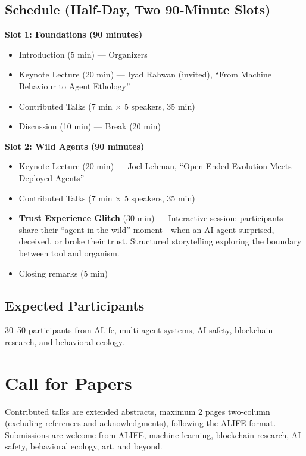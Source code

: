 \documentclass[letterpaper]{article}
\begin{document}
\subsection*{Schedule (Half-Day, Two 90-Minute Slots)}

\textbf{Slot 1: Foundations (90 minutes)}
\begin{itemize}[nosep]
\item Introduction (5 min) --- Organizers
\item Keynote Lecture (20 min) --- Iyad Rahwan (invited), ``From Machine Behaviour to Agent Ethology''
\item Contributed Talks (7 min $\times$ 5 speakers, 35 min)
\item Discussion (10 min) --- Break (20 min)
\end{itemize}

\textbf{Slot 2: Wild Agents (90 minutes)}
\begin{itemize}[nosep]
\item Keynote Lecture (20 min) --- Joel Lehman, ``Open-Ended Evolution Meets Deployed Agents''
\item Contributed Talks (7 min $\times$ 5 speakers, 35 min)
\item \textbf{Trust Experience Glitch} (30 min) --- Interactive session: participants share their ``agent in the wild'' moment---when an AI agent surprised, deceived, or broke their trust. Structured storytelling exploring the boundary between tool and organism.
\item Closing remarks (5 min)
\end{itemize}

\subsection*{Expected Participants}
30--50 participants from ALife, multi-agent systems, AI safety, blockchain research, and behavioral ecology.

\section{Call for Papers}

Contributed talks are extended abstracts, maximum 2 pages two-column (excluding references and acknowledgments), following the ALIFE format. Submissions are welcome from ALIFE, machine learning, blockchain research, AI safety, behavioral ecology, art, and beyond.
\end{document}
